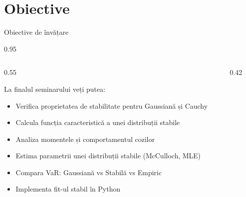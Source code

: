 \documentclass[9pt, aspectratio=169, t]{beamer}
\begin{document}
\section{Obiective}

\begin{frame}{Obiective de învățare}
    \begin{cminipage}{0.95\textwidth}
\begin{columns}[T]
\begin{column}{0.55\textwidth}
\begin{block}{La finalul seminarului veți putea:}
\begin{itemize}\setlength{\itemsep}{0pt}
    \item Verifica proprietatea de stabilitate pentru Gaussiană și Cauchy
    \item Calcula funcția caracteristică a unei distribuții stabile
    \item Analiza momentele și comportamentul cozilor
    \item Estima parametrii unei distribuții stabile (McCulloch, MLE)
    \item Compara VaR: Gaussiană vs Stabilă vs Empiric
    \item Implementa fit-ul stabil în Python
\end{itemize}
\end{block}
\end{column}
\begin{column}{0.42\textwidth}
\begin{center}
\end{center}
\end{column}
\end{columns}
    \end{cminipage}
\end{frame}
\end{document}

